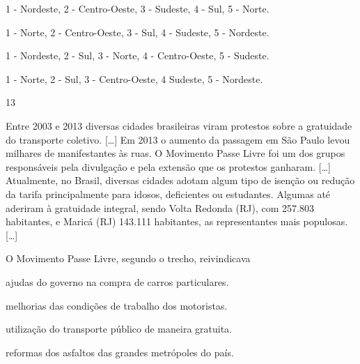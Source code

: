 \begin{escolha}
\item 1 - Nordeste, 2 - Centro-Oeste, 3 - Sudeste, 4 - Sul, 5 - Norte.

\item 1 - Norte, 2 - Centro-Oeste, 3 - Sul, 4 - Sudeste, 5 - Nordeste.

\item 1 - Nordeste, 2 - Sul, 3 - Norte, 4 - Centro-Oeste, 5 - Sudeste.

\item 1 - Norte, 2 - Sul, 3 - Centro-Oeste, 4 Sudeste, 5 - Nordeste.
\end{escolha}

\pagebreak
\num{13}

\begin{myquote}
Entre 2003 e 2013 diversas cidades brasileiras viram protestos sobre a
gratuidade do transporte coletivo. {[}\ldots{}{]} Em 2013 o aumento da passagem em São
Paulo levou milhares de manifestantes às ruas. O Movimento Passe Livre
foi um dos grupos responsáveis pela divulgação e pela extensão que os
protestos ganharam. {[}\ldots{}{]} Atualmente, no Brasil, diversas cidades adotam algum
tipo de isenção ou redução da tarifa principalmente para idosos,
deficientes ou estudantes. Algumas até aderiram à gratuidade integral,
sendo Volta Redonda (RJ), com 257.803 habitantes, e Maricá (RJ) 143.111
habitantes, as representantes mais populosas. {[}\ldots{}{]}

\end{myquote}

\noindent{}O Movimento Passe Livre, segundo o trecho, reivindicava

\begin{escolha}
\item ajudas do governo na compra de carros particulares.

\item melhorias das condições de trabalho dos motoristas.

\item utilização do transporte público de maneira gratuita.

\item reformas dos asfaltos das grandes metrópoles do país.
\end{escolha}



